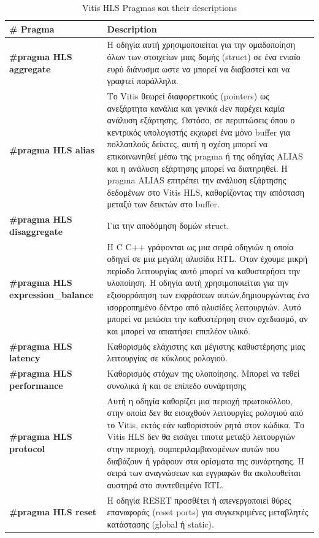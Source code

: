 \begin{longtable}{|p{4cm}|p{10cm}|}
  \caption{Vitis HLS Pragmas και their descriptions} \label{tab:vitis_hls_pragmas}
  \hline
  \textbf{\# Pragma} & \textbf{Description} \\
  \hline
  \textbf{\#pragma HLS aggregate} & Η οδηγία αυτή χρησιμοποιείται για την ομαδοποίηση όλων των στοιχείων
  μιας δομής (struct) σε ένα ενιαίο ευρύ διάνυσμα ωστε να μπορεί να διαβαστεί και να γραφτεί παράλληλα.\\
  \hline
  \textbf{\#pragma HLS alias} & Το Vitis θεωρεί διαφορετικούς  (pointers) ως ανεξάρτητα κανάλια και γενικά 
  dεν παρέχει καμία ανάλυση εξάρτησης. Ωστόσο, σε περιπτώσεις όπου ο κεντρικός υπολογιστής εκχωρεί ένα μόνο buffer
  για πολλαπλούς δείκτες, αυτή η σχέση μπορεί να επικοινωνηθεί μέσω της pragma ή της οδηγίας ALIAS και η ανάλυση εξάρτησης
  μπορεί να διατηρηθεί. Η pragma ALIAS επιτρέπει την ανάλυση εξάρτησης δεδομένων στο Vitis HLS, καθορίζοντας την απόσταση μεταξύ των δεικτών στο buffer.\\
  \hline
  \textbf{\#pragma HLS disaggregate} & Για την αποδόμηση δομών struct.\\
  \hline
  \textbf{\#pragma HLS expression\_balance} & Η C C++ γράφονται ως μια σειρά οδηγιών η οποία οδηγεί σε μια μεγάλη αλυσίδα RTL.
  Οταν έχουμε μικρή περίοδο λειτουργίας αυτό μπορεί να καθυστερήσει την υλοποίηση. Η οδηγία αυτή χρησιμοποιείται για την εξισορρόπηση
  των εκφράσεων αυτών,δημιουργώντας ένα ισορροπημένο δέντρο από αλυσίδες λειτουργιών. Αυτό μπορεί να μειώσει την καθυστέρηση στον σχεδιασμό, αν και μπορεί να απαιτήσει επιπλέον υλικό.\\
  \hline
  \textbf{\#pragma HLS latency} & Kαθορισμός ελάχιστης και μέγιστης καθυστέρησης μιας λειτουργίας σε κύκλους ρολογιού.\\
  \hline
  \textbf{\#pragma HLS performance} & Kαθορισμός στόχων της υλοποίησης. Μπορεί να τεθεί συνολικά ή και σε επίπεδο συνάρτησης\\
  \hline
  \textbf{\#pragma HLS protocol} & Αυτή η οδηγία καθορίζει μια περιοχή πρωτοκόλλου, στην οποία δεν θα εισαχθούν λειτουργίες ρολογιού από το Vitis,
  εκτός εάν καθοριστούν ρητά στον κώδικα. Το Vitis HLS δεν θα εισάγει τιποτα μεταξύ λειτουργιών στην περιοχή, συμπεριλαμβανομένων αυτών που διαβάζουν
  ή γράφουν στα ορίσματα της συνάρτησης. Η σειρά των αναγνώσεων και εγγραφών θα ακολουθείται αυστηρά στο συντεθειμένο RTL.\\
  \hline
  \textbf{\#pragma HLS reset} & Η οδηγία RESET προσθέτει ή απενεργοποιεί θύρες επαναφοράς (reset ports) για συγκεκριμένες μεταβλητές κατάστασης (global ή static).

\end{longtable}
